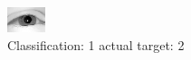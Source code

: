 \begin{figure}[h!]
\begin{center}
\includegraphics[width=0.60\columnwidth]{figures/ID2229_class_1_target_2.png}
\end{center}
\caption{ Classification: 1 actual target: 2}
\label{fig:ID2229_class_1_target_2}
\end{figure}

